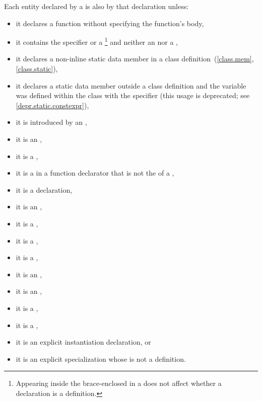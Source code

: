 \pnum
{}%
%
Each entity declared by a  is
also  by that declaration unless:
\begin{itemize}
\item
it declares a function
without specifying the function's body,
\item
it contains
the
%
 specifier or a
\footnote{Appearing inside the brace-enclosed
 in a  does
not affect whether a declaration is a definition.}
and neither an  nor a
,
\item
{}%
it declares a non-inline static data member in a class
definition~(\ref{class.mem}, \ref{class.static}),
\item
it declares a static data member outside a class definition
and the variable was defined within the class with the 
specifier (this usage is deprecated; see \ref{depr.static.constexpr}),
\item
{}%
it is introduced by an ,
\item
it is an
%
,
\item
it is a
%
,
\item
it is a
%
 in a function
%
declarator that is not the  of a
,
\item
it is a
%
 declaration,
\item it is
an ,
\item it is
a
,
\item it is
a ,
\item it is
a ,
\item
it is an
,
\item
it is an
,
\item it is
a ,
\item it is
a ,
\item it is
an explicit instantiation declaration, or
\item it is
an explicit specialization whose
 is not a definition.
\end{itemize}
